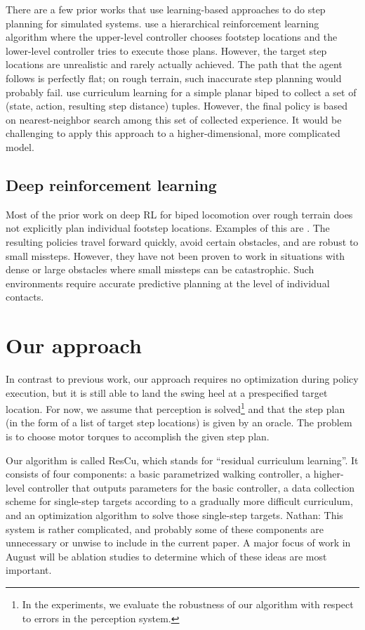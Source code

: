 \documentclass[a4paper]{article}
\newcommand{\nhatch}[1]{{\leavevmode\color{blue} Nathan: #1}}
\begin{document}
There are a few prior works that use learning-based approaches to do step planning for simulated systems.
\cite{peng2017deeploco} use a hierarchical reinforcement learning algorithm where the upper-level controller chooses footstep locations and the lower-level controller tries to execute those plans.
However, the target step locations are unrealistic and rarely actually achieved.
The path that the agent follows is perfectly flat; on rough terrain, such inaccurate step planning would probably fail.
\cite{karpathy2012curriculum} use curriculum learning for a simple planar biped to collect a set of (state, action, resulting step distance) tuples.
However, the final policy is based on nearest-neighbor search among this set of collected experience.
It would be challenging to apply this approach to a higher-dimensional, more complicated model.

\subsection{Deep reinforcement learning}

Most of the prior work on deep RL for biped locomotion over rough terrain does not explicitly plan individual footstep locations.
Examples of this are \cite{peng2018deepmimic, heess2017emergence, peng2016terrain}. The resulting policies travel forward quickly, avoid certain obstacles, and are robust to small missteps.
However, they have not been proven to work in situations with dense or large obstacles where small missteps can be catastrophic.
Such environments require accurate predictive planning at the level of individual contacts.

\section{Our approach}

In contrast to previous work, our approach requires no optimization during policy execution, but it is still able to land the swing heel at a prespecified target location.
For now, we assume that perception is solved\footnote{In the experiments, we evaluate the robustness of our algorithm with respect to errors in the perception system.} and that the step plan (in the form of a list of target step locations) is given by an oracle.
The problem is to choose motor torques to accomplish the given step plan.


Our algorithm is called ResCu, which stands for ``residual curriculum learning''.
It consists of four components: a basic parametrized walking controller, a higher-level controller that outputs parameters for the basic controller, a data collection scheme for single-step targets according to a gradually more difficult curriculum, and an optimization algorithm to solve those single-step targets.
\nhatch{This system is rather complicated, and probably some of these components are unnecessary or unwise to include in the current paper. A major focus of work in August will be ablation studies to determine which of these ideas are most important.}
\end{document}
